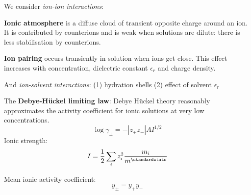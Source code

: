 We consider \textit{ion-ion interactions}:

\textbf{Ionic atmosphere} is a diffuse cloud of transient opposite charge around an ion. It is contributed by counterions and 
is weak when solutions are dilute: there is less stabilisation by counterions.

\textbf{Ion pairing} occurs transiently in solution when ions get close. This effect increases
with concentration, dielectric constant $\epsilon_r$ and charge density.

And \textit{ion-solvent interactions}:
(1) hydration shells
(2) effect of solvent $\epsilon_r$
 
The \textbf{Debye-H\"uckel limiting law}:
Debye H\"uckel theory reasonably approximates the activity coefficient for ionic solutions at very low 
concentrations.
\begin{equation*}
    \log \gamma_\pm = - |z_+ z_-| AI^{1/2}
\end{equation*}
Ionic strength:
\begin{equation*}
    I = \frac{1}{2}\sum_i z_i^2 \frac{m_i}{m^\standardstate}
\end{equation*}

\columnbreak
Mean ionic activity coefficient:
\begin{equation*}
    y_\pm = y_+ y_-
\end{equation*}


 
